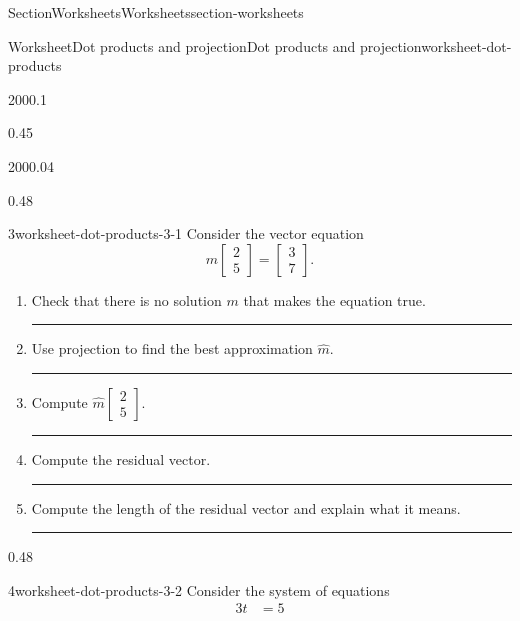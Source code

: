 \documentclass[oneside,10pt,]{article}
\newlength{\ptxworkspacestrutwidth}
\numberwithin{equation}{section}
\newcommand{\amp}{&}
\begin{document}
\begin{sectionptx}{Section}{Worksheets}{}{Worksheets}{}{}{section-worksheets}
\begin{worksheet-subsection}{Worksheet}{Dot products and projection}{}{Dot products and projection}{}{}{worksheet-dot-products}
\begin{savenotes}
\begin{sidebyside}{2}{0}{0}{0.1}
\begin{sbspanel}{0.45}
\end{sbspanel}%
\end{sidebyside}%
\end{savenotes}%
\begin{savenotes}%
\begin{sidebyside}{2}{0}{0}{0.04}%
\begin{sbspanel}{0.48}%
\begin{divisionexercise}{3}{}{}{worksheet-dot-products-3-1}%
Consider the vector equation%
\begin{equation*}
m \begin{bmatrix}2 \\ 5\end{bmatrix} = \begin{bmatrix}3 \\ 7\end{bmatrix}\text{.}
\end{equation*}
%
\begin{enumerate}[font=\bfseries,label=(\alph*),ref=\alph*]%
\item{}Check that there is no solution \(m\) that makes the equation true.%
\par\rule{\ptxworkspacestrutwidth}{1.25in}%
\item{}Use projection to find the best approximation \(\hat m\).%
\par\rule{\ptxworkspacestrutwidth}{1.25in}%
\item{}Compute \(\hat m \begin{bmatrix}2 \\ 5\end{bmatrix} \).%
\par\rule{\ptxworkspacestrutwidth}{1.25in}%
\item{}Compute the residual vector.%
\par\rule{\ptxworkspacestrutwidth}{1.25in}%
\item{}Compute the length of the residual vector and explain what it means.%
\par\rule{\ptxworkspacestrutwidth}{1.25in}%
\end{enumerate}%
\end{divisionexercise}%
\end{sbspanel}%
\begin{sbspanel}{0.48}%
\begin{savenotes}%
\begin{divisionexercise}{4}{}{}{worksheet-dot-products-3-2}%
Consider the system of equations%
\begin{align*}
3t \amp =5\\

\end{align*}
\end{divisionexercise}
\end{savenotes}
\end{sbspanel}
\end{sidebyside}
\end{savenotes}
\end{worksheet-subsection}
\end{sectionptx}
\end{document}
